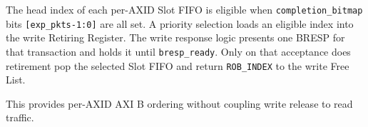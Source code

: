 The head index of each per-AXID Slot FIFO is eligible when
\texttt{completion\_bitmap} bits \texttt{[exp\_pkts-1:0]} are all set.  A
priority selection loads an eligible index into the write Retiring Register.  The write response
logic presents one BRESP for that transaction and holds it until
\texttt{bresp\_ready}.  Only on that acceptance does retirement pop the
selected Slot FIFO and return \texttt{ROB\_INDEX} to the write Free List.

This provides per-AXID AXI B ordering without coupling write release to read
traffic.
